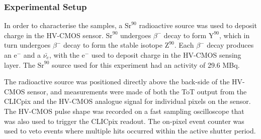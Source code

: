\subsubsection{Experimental Setup}

In order to characterise the samples, a $\text{Sr}^{90}$ radioactive source was used to deposit charge in the HV-CMOS sensor. $\text{Sr}^{90}$ undergoes $\beta^{-}$ decay to form $\text{Y}^{90}$, which in turn undergoes $\beta^{-}$ decay to form the stable isotope $\text{Z}^{90}$.  Each $\beta^{-}$ decay produces an $\text{e}^{-}$ and a $\bar{\nu_{e}}$, with the $\text{e}^{-}$ used to deposit charge in the HV-CMOS sensing layer.  The $\text{Sr}^{90}$ source used for this experiment had an activity of 29.6 MBq.  

The radioactive source was positioned directly above the back-side of the HV-CMOS sensor, and measurements were made of both the ToT output from the CLICpix and the HV-CMOS analogue signal for individual pixels on the sensor.  The HV-CMOS pulse shape was recorded on a fast sampling oscilloscope that was also used to trigger the CLICpix readout.  The on-pixel event counter was used to veto events where multiple hits occurred within the active shutter period.  

